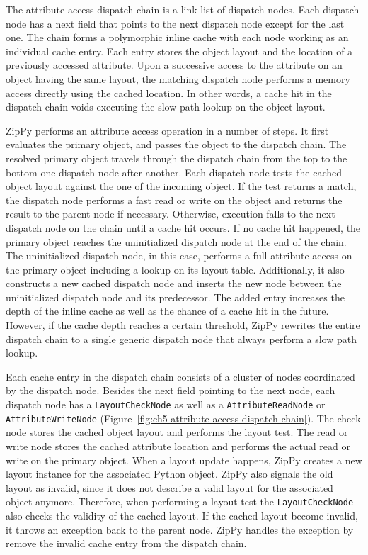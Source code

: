 The attribute access dispatch chain is a link list of dispatch nodes.
Each dispatch node has a \textsf{next} field that points to the next dispatch node except for the last one.
The chain forms a polymorphic inline cache with each node working as an individual cache entry.
Each entry stores the object layout and the location of a previously accessed attribute.
Upon a successive access to the attribute on an object having the same layout, the matching dispatch node performs a memory access directly using the cached location.
In other words, a cache hit in the dispatch chain voids executing the slow path lookup on the object layout.

ZipPy performs an attribute access operation in a number of steps.
It first evaluates the primary object, and passes the object to the dispatch chain.
The resolved primary object travels through the dispatch chain from the top to the bottom one dispatch node after another.
Each dispatch node tests the cached object layout against the one of the incoming object.
If the test returns a match, the dispatch node performs a fast read or write on the object and returns the result to the parent node if necessary.
Otherwise, execution falls to the next dispatch node on the chain until a cache hit occurs.
If no cache hit happened, the primary object reaches the uninitialized dispatch node at the end of the chain.
The uninitialized dispatch node, in this case, performs a full attribute access on the primary object including a lookup on its layout table.
Additionally, it also constructs a new cached dispatch node and inserts the new node between the uninitialized dispatch node and its predecessor.
The added entry increases the depth of the inline cache as well as the chance of a cache hit in the future.
However, if the cache depth reaches a certain threshold, ZipPy rewrites the entire dispatch chain to a single generic dispatch node that always perform a slow path lookup.

Each cache entry in the dispatch chain consists of a cluster of nodes coordinated by the dispatch node.
Besides the \textsf{next} field pointing to the next node, each dispatch node has a \texttt{LayoutCheckNode} as well as a \texttt{AttributeReadNode} or \texttt{AttributeWriteNode} (Figure~\ref{fig:ch5-attribute-access-dispatch-chain}).
The \textsf{check} node stores the cached object layout and performs the layout test.
The \textsf{read} or \textsf{write} node stores the cached attribute location and performs the actual read or write on the primary object.
When a layout update happens, ZipPy creates a new layout instance for the associated Python object.
ZipPy also signals the old layout as invalid, since it does not describe a valid layout for the associated object anymore.
Therefore, when performing a layout test the \texttt{LayoutCheckNode} also checks the validity of the cached layout.
If the cached layout become invalid, it throws an exception back to the parent node.
ZipPy handles the exception by remove the invalid cache entry from the dispatch chain.

